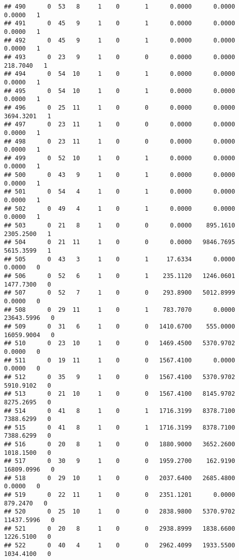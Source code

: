 \documentclass[
]{article}
\begin{document}
\begin{enumerate}
\begin{verbatim}
## 490      0  53   8     1    0       1      0.0000      0.0000      0.0000   1
## 491      0  45   9     1    0       1      0.0000      0.0000      0.0000   1
## 492      0  45   9     1    0       1      0.0000      0.0000      0.0000   1
## 493      0  23   9     1    0       0      0.0000      0.0000    218.7040   1
## 494      0  54  10     1    0       1      0.0000      0.0000      0.0000   1
## 495      0  54  10     1    0       1      0.0000      0.0000      0.0000   1
## 496      0  25  11     1    0       0      0.0000      0.0000   3694.3201   1
## 497      0  23  11     1    0       0      0.0000      0.0000      0.0000   1
## 498      0  23  11     1    0       0      0.0000      0.0000      0.0000   1
## 499      0  52  10     1    0       1      0.0000      0.0000      0.0000   1
## 500      0  43   9     1    0       1      0.0000      0.0000      0.0000   1
## 501      0  54   4     1    0       1      0.0000      0.0000      0.0000   1
## 502      0  49   4     1    0       1      0.0000      0.0000      0.0000   1
## 503      0  21   8     1    0       0      0.0000    895.1610   2305.2500   1
## 504      0  21  11     1    0       0      0.0000   9846.7695   5615.3599   1
## 505      0  43   3     1    0       1     17.6334      0.0000      0.0000   0
## 506      0  52   6     1    0       1    235.1120   1246.0601   1477.7300   0
## 507      0  52   7     1    0       0    293.8900   5012.8999      0.0000   0
## 508      0  29  11     1    0       1    783.7070      0.0000  23643.5996   0
## 509      0  31   6     1    0       0   1410.6700    555.0000  16059.9004   0
## 510      0  23  10     1    0       0   1469.4500   5370.9702      0.0000   0
## 511      0  19  11     1    0       0   1567.4100      0.0000      0.0000   0
## 512      0  35   9     1    0       0   1567.4100   5370.9702   5910.9102   0
## 513      0  21  10     1    0       0   1567.4100   8145.9702   8275.2695   0
## 514      0  41   8     1    0       1   1716.3199   8378.7100   7388.6299   0
## 515      0  41   8     1    0       1   1716.3199   8378.7100   7388.6299   0
## 516      0  20   8     1    0       0   1880.9000   3652.2600   1018.1500   0
## 517      0  30   9     1    0       0   1959.2700    162.9190  16809.0996   0
## 518      0  29  10     1    0       0   2037.6400   2685.4800      0.0000   0
## 519      0  22  11     1    0       0   2351.1201      0.0000    879.2470   0
## 520      0  25  10     1    0       0   2838.9800   5370.9702  11437.5996   0
## 521      0  20   8     1    0       0   2938.8999   1838.6600   1226.5100   0
## 522      0  40   4     1    0       0   2962.4099   1933.5500   1034.4100   0

\end{verbatim}
\end{enumerate}
\end{document}

